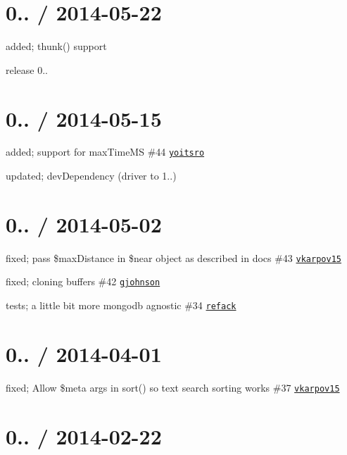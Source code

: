 \section*{0.. / 2014-\/05-\/22 }


\begin{DoxyItemize}
\item added; thunk() support
\item release 0..
\end{DoxyItemize}

\section*{0.. / 2014-\/05-\/15 }


\begin{DoxyItemize}
\item added; support for max\+Time\+MS \#44 \href{https://github.com/yoitsro}{\tt yoitsro}
\item updated; dev\+Dependency (driver to 1..)
\end{DoxyItemize}

\section*{0.. / 2014-\/05-\/02 }


\begin{DoxyItemize}
\item fixed; pass \$max\+Distance in \$near object as described in docs \#43 \href{https://github.com/vkarpov15}{\tt vkarpov15}
\item fixed; cloning buffers \#42 \href{https://github.com/gjohnson}{\tt gjohnson}
\item tests; a little bit more {\ttfamily mongodb} agnostic \#34 \href{https://github.com/refack}{\tt refack}
\end{DoxyItemize}

\section*{0.. / 2014-\/04-\/01 }


\begin{DoxyItemize}
\item fixed; Allow \$meta args in sort() so text search sorting works \#37 \href{https://github.com/vkarpov15}{\tt vkarpov15}
\end{DoxyItemize}

\section*{0.. / 2014-\/02-\/22 }


